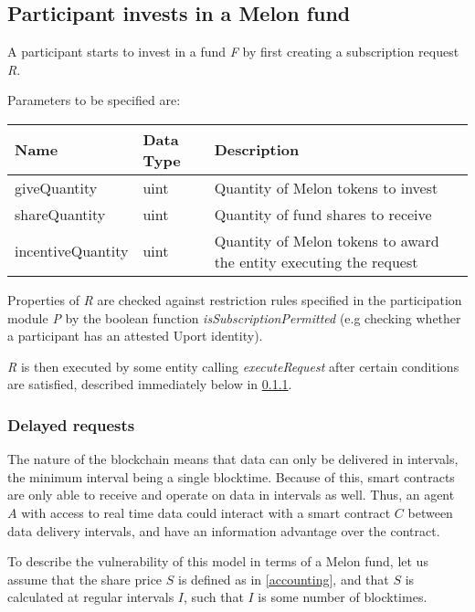 \documentclass[conference]{IEEEtran}
\begin{document}
\subsection{Participant invests in a Melon fund} \label{invest}

A participant starts to invest in a fund \textit{F} by first creating a subscription request \textit{R}.

Parameters to be specified are:

\begin{center}
		\footnotesize
		\begin{tabular}{ | p{2.7cm} | p{1.2cm} | p{4cm} | }
		\hline
		Name & Data Type & Description \\ \hline
		giveQuantity & uint & Quantity of Melon tokens to invest \\ \hline
		shareQuantity & uint & Quantity of fund shares to receive \\ \hline
		incentiveQuantity & uint & Quantity of Melon tokens to award the entity executing the request \\ \hline
	\end{tabular}
\end{center}

Properties of \textit{R} are checked against restriction rules specified in the participation module \textit{P} by the boolean function \textit{isSubscriptionPermitted} (e.g checking whether a participant has an attested Uport identity).

\textit{R} is then executed by some entity calling \textit{executeRequest} after certain conditions are satisfied, described immediately below in \ref{delayed-requests}.

\subsubsection{Delayed requests} \label{delayed-requests}

The nature of the blockchain means that data can only be delivered in intervals, the minimum interval being a single blocktime.
Because of this, smart contracts are only able to receive and operate on data in intervals as well.
Thus, an agent $A$ with access to real time data could interact with a smart contract $C$ between data delivery intervals, and have an information advantage over the contract.

To describe the vulnerability of this model in terms of a Melon fund, let us assume that the share price $S$ is defined as in \ref{accounting}, and that $S$ is calculated at regular intervals $I$, such that $I$ is some number of blocktimes.
\end{document}
